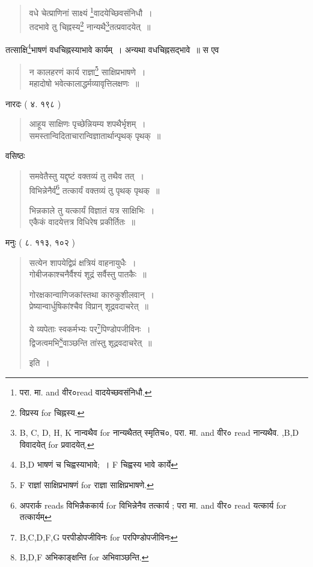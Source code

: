 \documentclass[11pt, openany]{book}
\begin{document}
\begin{quote}
{\vy वधे चेत्प्राणिनां साक्ष्यं \renewcommand{\thefootnote}{8}\footnote{परा. मा. and वीर०read वादयेच्छवसंनिधौ.}वादयेच्छिवसंनिधौ~।\\
तदभावे तु चिह्नस्य\renewcommand{\thefootnote}{9}\footnote{विप्रस्य for चिह्नस्य.} नान्यथै\renewcommand{\thefootnote}{10}\footnote{B, C, D, H, K नान्वथैव for नान्यथैतत् स्मृतिच०, परा. मा. and वीर० read नान्यथैव. ,B,D विवादयेत् for प्रवादयेत्.}तत्प्रवादयेत्~॥}
\end{quote}

\newpage

\noindent
तत्साक्षि\renewcommand{\thefootnote}{1}\footnote{B,D भाषणं च चिह्वस्याभावे;~। F चिह्वस्य भावे कार्ये}भाषणं वधचिह्नस्याभावे कार्यम्~। अन्यथा वधचिह्नसद्भावे~॥ स एव

\begin{quote}
{\vy न कालहरणं कार्य राज्ञा\renewcommand{\thefootnote}{2}\footnote{F राज्ञां साक्षिप्रभाषणं for राज्ञा साक्षिप्रभाषणे.} साक्षिप्रभाषणे~।\\
महादोषो भवेत्कालाद्धर्मव्यावृत्तिलक्षणः~॥}
\end{quote}

नारदः ( ४. १९८ )

\begin{quote}
{\vy आहूय साक्षिणः पृच्छेन्नियम्य शपथैर्भृशम्~।\\
समस्तान्विदिताचारान्विज्ञातार्थान्पृथक् पृथक्~॥}
\end{quote}

वसिष्ठः

\begin{quote}
{\vy समवेतैस्तु यद्दृष्टं वक्तव्यं तु तथैव तत्~।\\
विभिन्नेनैर्व\renewcommand{\thefootnote}{3}\footnote{अपरार्क reads विभिन्नैककार्य for विभिन्नेनैव तत्कार्य ; परा मा. and वीर० read यत्कार्य for तत्कार्यम्} तत्कार्यं वक्तव्यं तु पृथक् पृथक्~॥

भिन्नकाले तु यत्कार्यं विज्ञातं यत्र साक्षिभिः~।\\
एकैकं वादयेत्तत्र विधिरेष प्रकीर्तितः~॥}
\end{quote}

मनुः ( ८. ११३, १०२ )

\begin{quote}
{\vy सत्येन शापयेद्विप्रं क्षत्रियं वाहनायुधैः~।\\
गोबीजकाश्चनैर्वैश्यं शूद्रं सर्वैस्तु पातकैः~॥

गोरक्षकान्वाणिजकांस्तथा कारुकुशीलवान्~।\\
प्रेष्यान्वार्धुषिकांश्चैव विप्रान् शूद्रवदाचरेत्~॥

ये व्यपेताः स्वकर्मभ्यः पर\renewcommand{\thefootnote}{4}\footnote{B,C,D,F,G परपीडोपजीविनः for परपिण्डोपजीविनः}पिण्डोपजीविनः~।\\
द्विजत्वमभि\renewcommand{\thefootnote}{5}\footnote{B,D,F अभिकाङ्क्षन्ति for अभिवाञ्छन्ति.}वाञ्छन्ति तांस्तु शूद्रवदाचरेत्~॥} इति~।
\end{quote}
\end{document}
